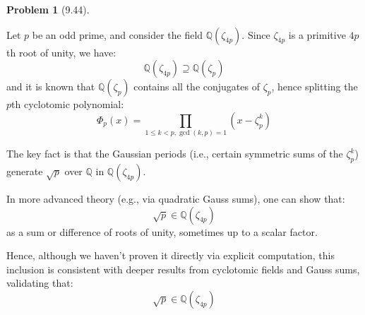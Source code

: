 \documentclass[12pt]{article}
\theoremstyle{definition}
\newtheorem{problem}{Problem}
\begin{document}
\begin{problem}[9.44]
\begin{enumerate}[label=(\alph*)]
        \begin{solution}
            Let $p$ be an odd prime, and consider the field $\mathbb{Q}(\zeta_{4p})$. Since $\zeta_{4p}$ is a primitive $4p$th root of unity, we have:
            \[
                \mathbb{Q}(\zeta_{4p}) \supseteq \mathbb{Q}(\zeta_p)
            \]
            and it is known that $\mathbb{Q}(\zeta_p)$ contains all the conjugates of $\zeta_p$, hence splitting the $p$th cyclotomic polynomial:
            \[
                \Phi_p(x) = \prod_{1 \le k < p, \gcd(k,p)=1} (x - \zeta_p^k)
            \]

            The key fact is that the Gaussian periods (i.e., certain symmetric sums of the $\zeta_p^k$) generate $\sqrt{p}$ over $\mathbb{Q}$ in $\mathbb{Q}(\zeta_{4p})$.

            In more advanced theory (e.g., via quadratic Gauss sums), one can show that:
            \[
                \sqrt{p} \in \mathbb{Q}(\zeta_{4p})
            \]
            as a sum or difference of roots of unity, sometimes up to a scalar factor.

            Hence, although we haven’t proven it directly via explicit computation, this inclusion is consistent with deeper results from cyclotomic fields and Gauss sums, validating that:
            \[
                \sqrt{p} \in \mathbb{Q}(\zeta_{4p})
            \]
        \end{solution}
    \end{enumerate}
\end{problem}
\end{document}
